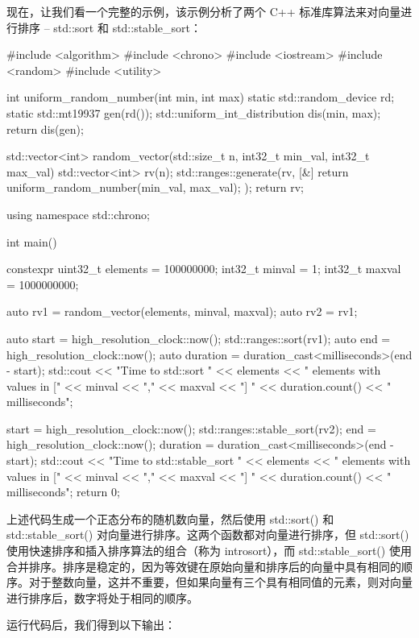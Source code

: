 现在，让我们看一个完整的示例，该示例分析了两个 C++ 标准库算法来对向量进行排序 – std::sort 和 std::stable\_sort：

\begin{cpp}
#include <algorithm>
#include <chrono>
#include <iostream>
#include <random>
#include <utility>

int uniform_random_number(int min, int max) {
    static std::random_device rd;
    static std::mt19937 gen(rd());
    std::uniform_int_distribution dis(min, max);
    return dis(gen);
}

std::vector<int> random_vector(std::size_t n, int32_t min_val, int32_t
max_val) {
    std::vector<int> rv(n);
    std::ranges::generate(rv, [&] {
        return uniform_random_number(min_val, max_val);
    });
    return rv;
}

using namespace std::chrono;

int main() {
    constexpr uint32_t elements = 100000000;
    int32_t minval = 1;
    int32_t maxval = 1000000000;

    auto rv1 = random_vector(elements, minval, maxval);
    auto rv2 = rv1;

    auto start = high_resolution_clock::now();
    std::ranges::sort(rv1);
    auto end = high_resolution_clock::now();
    auto duration = duration_cast<milliseconds>(end - start);
    std::cout << "Time to std::sort "
              << elements << " elements with values in ["
              << minval << "," << maxval << "] "
              << duration.count() << " milliseconds\n";

    start = high_resolution_clock::now();
    std::ranges::stable_sort(rv2);
    end = high_resolution_clock::now();
    duration = duration_cast<milliseconds>(end - start);
    std::cout << "Time to std::stable_sort "
              << elements << " elements with values in ["
              << minval << "," << maxval << "] "
              << duration.count() << " milliseconds\n";
    return 0;
}
\end{cpp}

上述代码生成一个正态分布的随机数向量，然后使用 std::sort() 和 std::stable\_sort() 对向量进行排序。这两个函数都对向量进行排序，但 std::sort() 使用快速排序和插入排序算法的组合（称为 introsort），而 std::stable\_sort() 使用合并排序。排序是稳定的，因为等效键在原始向量和排序后的向量中具有相同的顺序。对于整数向量，这并不重要，但如果向量有三个具有相同值的元素，则对向量进行排序后，数字将处于相同的顺序。

运行代码后，我们得到以下输出：

